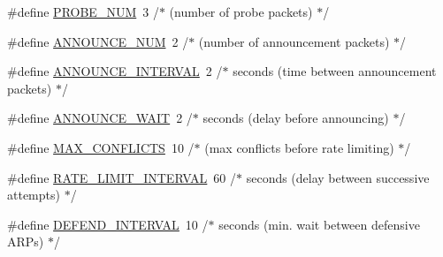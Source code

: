 \begin{DoxyCompactItemize}
\item 
\#define \hyperlink{openmote-cc2538_2lwip_2src_2include_2lwip_2prot_2autoip_8h_a3a610440fbb8d2c6abb4aa9702f904ef}{P\+R\+O\+B\+E\+\_\+\+N\+UM}~3   /$\ast$          (number of probe packets)              $\ast$/
\item 
\#define \hyperlink{openmote-cc2538_2lwip_2src_2include_2lwip_2prot_2autoip_8h_a29141f41d1391d34730b75539000f9ea}{A\+N\+N\+O\+U\+N\+C\+E\+\_\+\+N\+UM}~2   /$\ast$          (number of announcement packets)       $\ast$/
\item 
\#define \hyperlink{openmote-cc2538_2lwip_2src_2include_2lwip_2prot_2autoip_8h_a7ed8f0b9d3330a2967142e0e48b28521}{A\+N\+N\+O\+U\+N\+C\+E\+\_\+\+I\+N\+T\+E\+R\+V\+AL}~2   /$\ast$ seconds  (time between announcement packets)    $\ast$/
\item 
\#define \hyperlink{openmote-cc2538_2lwip_2src_2include_2lwip_2prot_2autoip_8h_a1a9b374b5e2e6da152f3a1556d09e6b3}{A\+N\+N\+O\+U\+N\+C\+E\+\_\+\+W\+A\+IT}~2   /$\ast$ seconds  (delay before announcing)              $\ast$/
\item 
\#define \hyperlink{openmote-cc2538_2lwip_2src_2include_2lwip_2prot_2autoip_8h_a14d30da6b838f3d718c0d92a9f3f3816}{M\+A\+X\+\_\+\+C\+O\+N\+F\+L\+I\+C\+TS}~10  /$\ast$          (max conflicts before rate limiting)   $\ast$/
\item 
\#define \hyperlink{openmote-cc2538_2lwip_2src_2include_2lwip_2prot_2autoip_8h_a420da51b5955d94c44d285638b3931bf}{R\+A\+T\+E\+\_\+\+L\+I\+M\+I\+T\+\_\+\+I\+N\+T\+E\+R\+V\+AL}~60  /$\ast$ seconds  (delay between successive attempts)    $\ast$/
\item 
\#define \hyperlink{openmote-cc2538_2lwip_2src_2include_2lwip_2prot_2autoip_8h_a5c21e0d4d66eb7056ba4d515d36f0a20}{D\+E\+F\+E\+N\+D\+\_\+\+I\+N\+T\+E\+R\+V\+AL}~10  /$\ast$ seconds  (min. wait between defensive A\+R\+Ps)     $\ast$/
\end{DoxyCompactItemize}
